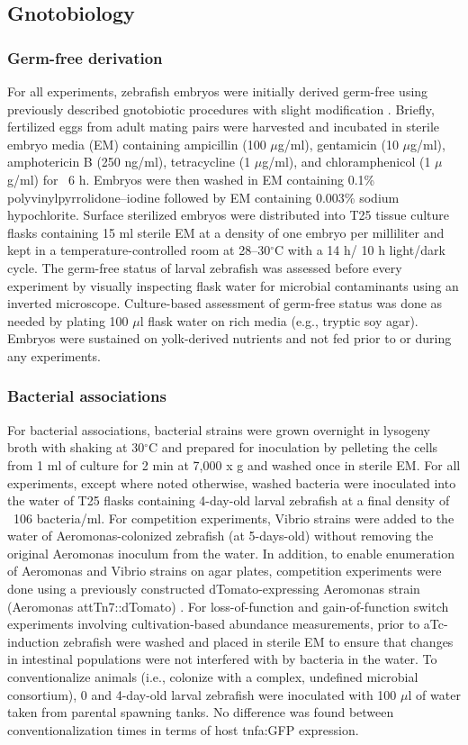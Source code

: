 \subsection{Gnotobiology}

\subsubsection{Germ-free derivation}
For all experiments, zebrafish embryos were initially derived germ-free using previously described gnotobiotic procedures with slight modification \cite{melancon_best_2017}. Briefly, fertilized eggs from adult mating pairs were harvested and incubated in sterile embryo media (EM) containing ampicillin (100 $\mu$g/ml), gentamicin (10 $\mu$g/ml), amphotericin B (250 ng/ml), tetracycline (1 $\mu$g/ml), and chloramphenicol (1 $\mu$g/ml) for ~6 h. Embryos were then washed in EM containing 0.1\% polyvinylpyrrolidone–iodine followed by EM containing 0.003\% sodium hypochlorite. Surface sterilized embryos were distributed into T25 tissue culture flasks containing 15 ml sterile EM at a density of one embryo per milliliter and kept in a temperature-controlled room at 28–30$^\circ$C with a 14 h/ 10 h light/dark cycle. The germ-free status of larval zebrafish was assessed before every experiment by visually inspecting flask water for microbial contaminants using an inverted microscope. Culture-based assessment of germ-free status was done as needed by plating 100 $\mu$l flask water on rich media (e.g., tryptic soy agar). Embryos were sustained on yolk-derived nutrients and not fed prior to or during any experiments. 

\subsubsection{Bacterial associations} 
For bacterial associations, bacterial strains were grown overnight in lysogeny broth with shaking at 30$^\circ$C and prepared for inoculation by pelleting the cells from 1 ml of culture for 2 min at 7,000 x g and washed once in sterile EM. For all experiments, except where noted otherwise, washed bacteria were inoculated into the water of T25 flasks containing 4-day-old larval zebrafish at a final density of ~106 bacteria/ml. For competition experiments, Vibrio strains were added to the water of Aeromonas-colonized zebrafish (at 5-days-old) without removing the original Aeromonas inoculum from the water. In addition, to enable enumeration of Aeromonas and Vibrio strains on agar plates, competition experiments were done using a previously constructed dTomato-expressing Aeromonas strain (Aeromonas attTn7::dTomato) \cite{wiles_modernized_2018}. For loss-of-function and gain-of-function switch experiments involving cultivation-based abundance measurements, prior to aTc-induction zebrafish were washed and placed in sterile EM to ensure that changes in intestinal populations were not interfered with by bacteria in the water. To conventionalize animals (i.e., colonize with a complex, undefined microbial consortium), 0 and 4-day-old larval zebrafish were inoculated with 100 $\mu$l of water taken from parental spawning tanks. No difference was found between conventionalization times in terms of host tnfa:GFP expression. 

